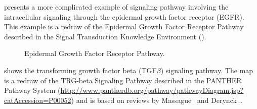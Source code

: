  presents a more complicated example of signaling pathway involving the intracellular signaling through the epidermal growth factor receptor (EGFR).  This example is a redraw of the Epidermal Growth Factor Receptor Pathway described in the Signal Transduction Knowledge Environment (\stkeurl).

\begin{figure}
\begin{center}
\caption{Epidermal Growth Factor Receptor Pathway.}\label{fig:EGF}
\end{center}
\end{figure}

 shows the transforming growth factor beta (TGF$\beta$) signaling pathway.  The map is a redraw of the TRG-beta Signaling Pathway described in the PANTHER Pathway System (\url{http://www.pantherdb.org/pathway/pathwayDiagram.jsp?catAccession=P00052}) and is based on reviews by Massague~\cite{Massague:1998} and Derynck~\cite{Derynck:2001}.

